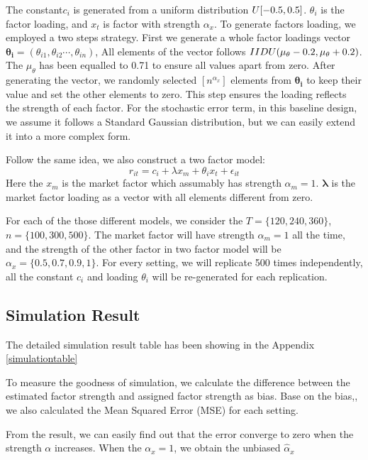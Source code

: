 \documentclass[12pt]{article}
\begin{document}
The constant$c_i$ is generated from a uniform distribution $\mathnormal{U}[-0.5, 0.5]$.
$\theta_{i}$ is the factor loading, and $x_t$ is factor with strength $\alpha_{x}$.
	 To generate factors loading, we employed a two steps strategy.
	 First we generate a whole factor loadings vector $\mathbf{\theta_i} = (\theta_{i1}, \theta_{i2} \cdots, \theta_{in})$,
	 All elements of the vector follows $\mathnormal{IIDU}(\mu_{\theta} -0.2, \mu_{\theta} + 0.2)$. 
	 The $\mu_{\theta}$ has been equalled to 0.71 to ensure all values apart from zero. 
	 After generating the vector, we randomly selected $[n^{\alpha_{x}}]$ elements from $\mathbf{\theta_i}$ to keep their value and set the other elements to zero. 
	 This step ensures the loading reflects the strength of each factor. 
	 For the stochastic error term, in this baseline design, we assume it follows a Standard Gaussian distribution, but we can easily extend it into a more complex form.
	 
	 Follow the same idea, we also construct a two factor model:
	 \[   r_{it} = c_i + \lambda x_m  + \theta_{i}x_{t} +\epsilon_{it}   \]
	 Here the $x_m$ is the market factor which assumably  has strength $\alpha_{m} = 1$. 
	 $\mathbf{\lambda}$ is the market factor loading as a vector with all elements different from zero. 
	 
	 For each of the those different models, we consider the $T = \{120, 240, 360\}$, $n =\{100, 300, 500\} $.
	  The market factor will have strength $\alpha_m = 1$ all the time, and the strength of the other factor in two factor model will be $\alpha_{x} = \{0.5, 0.7, 0.9,1\}$. For every setting, we will replicate 500 times independently, all the constant $c_i$ and loading $\theta_i$ will be re-generated for each replication.
	 \subsection{Simulation Result}
	The detailed simulation result table has been showing in the Appendix \ref{simulationtable}
	
To measure the goodness of simulation, we calculate the difference between the estimated factor strength and assigned factor strength as bias.
Base on the bias,, we also calculated the Mean Squared Error (MSE) for each setting.

From the result, we can easily find out that the error converge to zero when the strength $\alpha$ increases. 
When the $\alpha _x= 1$, we obtain the unbiased $\hat{\alpha}_{x}$

\newpage



\newpage
\appendix


\end{document}
